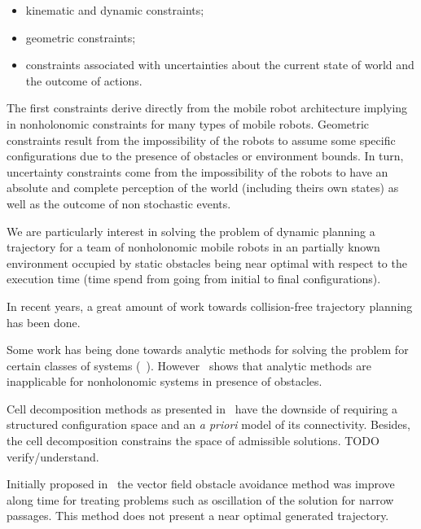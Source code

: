 \documentclass[eprint]{actapoly}
\begin{document}
\begin{itemize}

 \item kinematic and dynamic constraints;

 \item geometric constraints;

 \item constraints associated with uncertainties about the current state of 
world and the outcome of actions.

\end{itemize}

The first constraints derive directly from the mobile robot architecture 
implying in nonholonomic constraints for many types of mobile robots. Geometric 
constraints result from the impossibility of the robots to assume some specific 
configurations due to the presence of obstacles or environment bounds. In turn, 
uncertainty constraints come from the impossibility of the robots to have an 
absolute and complete perception of the world (including theirs own states) as 
well as the outcome of non stochastic events.

 

We are particularly interest in solving the problem of dynamic planning a 
trajectory for a team of nonholonomic mobile robots in an partially known 
environment occupied by static obstacles being near optimal with respect to the 
execution time (time spend from going from initial to final configurations).

 


In recent years, a great amount of work towards collision-free trajectory 
planning has been done.

 

Some work has being done towards analytic methods for solving the problem for 
certain classes of systems (~\cite{}). However~\cite{schwartz1988survey} shows 
that analytic methods  are inapplicable for nonholonomic systems in presence of 
obstacles.

 

Cell decomposition methods as presented in~\cite{latombe2012robot} have the 
downside of requiring a structured configuration space and an \textit{a priori} 
model of its connectivity. Besides, the cell decomposition constrains the space 
of admissible solutions. TODO verify/understand.

 

Initially proposed in~\cite{Khatib1986} the vector field obstacle avoidance 
method was improve along time for treating problems such as oscillation of the 
solution for narrow passages. This method does not present a near optimal 
generated trajectory.
\end{document}
